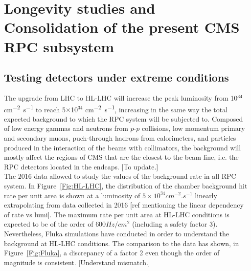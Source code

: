 \graphicspath{{chapt_dutch/}{intro/}{chapt2/}{chapt3/}{chapt4/}{chapt5/}{chapt6/}{chapt7/}}

\renewcommand\evenpagerightmark{{\scshape\small Chapter 5}}
\renewcommand\oddpageleftmark{{\scshape\small Consolidation and Research and Development approval}}

\hyphenation{}

\chapter[Longevity studies and Consolidation of the present \acs{CMS} \acs{RPC} subsystem]%
{Longevity studies and Consolidation of the present \acs{CMS} \acs{RPC} subsystem}
\label{chapt:5}

\section{Testing detectors under extreme conditions}
\label{sec:extreme}
	
	The upgrade from LHC to HL-LHC will increase the peak luminosity from 10$^{34}$ \si{cm^{-2}.s^{-1}} to reach 5$\times$10$^{34}$ \si{cm^{-2}.s^{-1}}, increasing in the same way the total expected background to which the RPC system will be subjected to.
	Composed of low energy gammas and neutrons from $p$-$p$ collisions, low momentum primary and secondary muons, puch-through hadrons from calorimeters, and particles produced in the interaction of the beams with collimators, the background will mostly affect the regions of CMS that are the closest to the beam line, i.e. the RPC detectors located in the endcaps. {\color{blue} [To update.]}\\
	
    The 2016 data allowed to study the values of the background rate in all RPC system.
	In Figure~\ref{Fig:HL-LHC}, the distribution of the chamber background hit rate per unit area is shown at a luminosity of $5\times10^{34}cm^{-2}.s^{-1}$ linearly extrapolating from data collected in 2016 {\color{blue} [ref mentioning the linear dependency of rate vs lumi]}.
	The maximum rate per unit area at HL-LHC conditions is expected to be of the order of ${600}{Hz/cm^2}$ (including a safety factor 3).
	Nevertheless, Fluka simulations have conducted in order to understand the background at HL-LHC conditions.
	The comparison to the data has shown, in Figure~\ref{Fig:Fluka}, a discrepancy of a factor 2 even though the order of magnitude is consistent. {\color{blue} [Understand mismatch.]}\\
    
